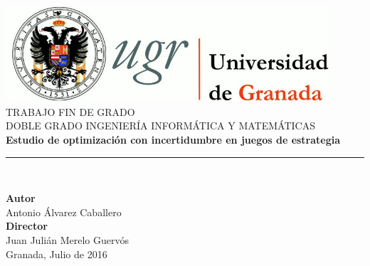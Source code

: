 \begin{titlepage}


\newlength{\centeroffset}
\setlength{\centeroffset}{-0.5\oddsidemargin}
\addtolength{\centeroffset}{0.5\evensidemargin}
\thispagestyle{empty}

\noindent\hspace*{\centeroffset}\begin{minipage}{\textwidth}

\centering
\includegraphics[width=0.9\textwidth]{imagenes/logo_ugr.jpg}\\[1.4cm]

\textsc{ \Large TRABAJO FIN DE GRADO\\[0.2cm]}
\textsc{ DOBLE GRADO INGENIERÍA INFORMÁTICA Y MATEMÁTICAS}\\[1cm]
%
{\Huge\bfseries Estudio de optimización con incertidumbre en juegos de estrategia\\
}
\noindent\rule[-1ex]{\textwidth}{3pt}\\[3.5ex]
\end{minipage}

\vspace{2.0cm}
\noindent\hspace*{\centeroffset}\begin{minipage}{\textwidth}
\centering

\textbf{Autor}\\ {Antonio Álvarez Caballero}\\[2.5ex]
\textbf{Director}\\
{Juan Julián Merelo Guervós}\\[2cm]

Granada, Julio de 2016
\end{minipage}
\end{titlepage}
